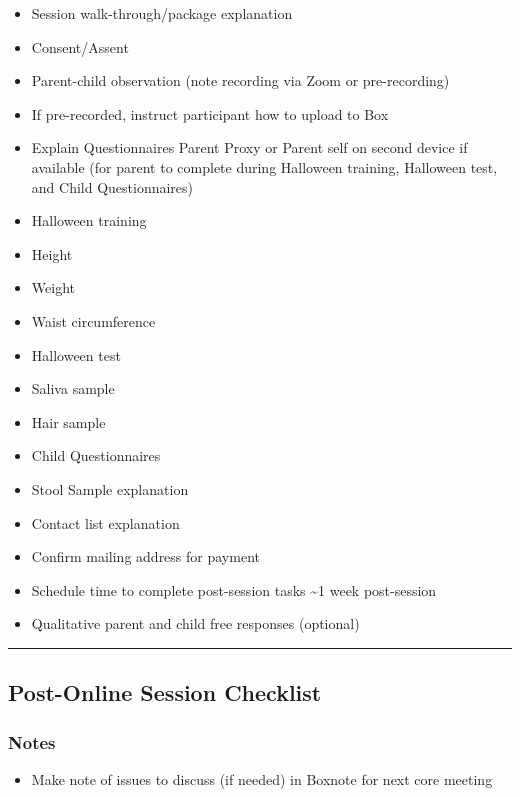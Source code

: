 \documentclass[]{book}
\providecommand{\tightlist}{%
  \setlength{\itemsep}{0pt}\setlength{\parskip}{0pt}}
\begin{document}
\begin{itemize}
\tightlist
\item
  Session walk-through/package explanation
\item
  Consent/Assent
\item
  Parent-child observation (note recording via Zoom or pre-recording)
\item
  If pre-recorded, instruct participant how to upload to Box
\item
  Explain Questionnaires Parent Proxy or Parent self on second device if available (for parent to complete during Halloween training, Halloween test, and Child Questionnaires)
\item
  Halloween training
\item
  Height
\item
  Weight
\item
  Waist circumference
\item
  Halloween test
\item
  Saliva sample
\item
  Hair sample
\item
  Child Questionnaires
\item
  Stool Sample explanation
\item
  Contact list explanation
\item
  Confirm mailing address for payment
\item
  Schedule time to complete post-session tasks \textasciitilde{}1 week post-session
\item
  Qualitative parent and child free responses (optional)
\end{itemize}

\begin{center}\rule{0.5\linewidth}{0.5pt}\end{center}

\hypertarget{post-online-session-checklist}{%
\subsection{Post-Online Session Checklist}\label{post-online-session-checklist}}

\hypertarget{notes}{%
\subsubsection{Notes}\label{notes}}

\begin{itemize}
\tightlist
\item
  Make note of issues to discuss (if needed) in Boxnote for next core meeting
\end{itemize}
\end{document}
